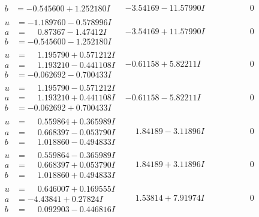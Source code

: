 \documentclass[1p]{elsarticle_modified}
\theoremstyle{definition}
\begin{document}
$$\begin{array}{c|c|c}
\begin{aligned}
b &= -0.545600 + 1.252180 I\end{aligned}
 & -3.54169 - 11.57990 I & \phantom{-0.000000 } 0 \\ \hline\begin{aligned}
u &= -1.189760 - 0.578996 I \\
a &= \phantom{-}0.87367 - 1.47412 I \\
b &= -0.545600 - 1.252180 I\end{aligned}
 & -3.54169 + 11.57990 I & \phantom{-0.000000 } 0 \\ \hline\begin{aligned}
u &= \phantom{-}1.195790 + 0.571212 I \\
a &= \phantom{-}1.193210 - 0.441108 I \\
b &= -0.062692 - 0.700433 I\end{aligned}
 & -0.61158 + 5.82211 I & \phantom{-0.000000 } 0 \\ \hline\begin{aligned}
u &= \phantom{-}1.195790 - 0.571212 I \\
a &= \phantom{-}1.193210 + 0.441108 I \\
b &= -0.062692 + 0.700433 I\end{aligned}
 & -0.61158 - 5.82211 I & \phantom{-0.000000 } 0 \\ \hline\begin{aligned}
u &= \phantom{-}0.559864 + 0.365989 I \\
a &= \phantom{-}0.668397 - 0.053790 I \\
b &= \phantom{-}1.018860 - 0.494833 I\end{aligned}
 & \phantom{-}1.84189 - 3.11896 I & \phantom{-0.000000 } 0 \\ \hline\begin{aligned}
u &= \phantom{-}0.559864 - 0.365989 I \\
a &= \phantom{-}0.668397 + 0.053790 I \\
b &= \phantom{-}1.018860 + 0.494833 I\end{aligned}
 & \phantom{-}1.84189 + 3.11896 I & \phantom{-0.000000 } 0 \\ \hline\begin{aligned}
u &= \phantom{-}0.646007 + 0.169555 I \\
a &= -4.43841 + 0.27824 I \\
b &= \phantom{-}0.092903 - 0.446816 I\end{aligned}
 & \phantom{-}1.53814 + 7.91974 I & \phantom{-0.000000 } 0 \\ \hline\begin{aligned}

\end{aligned}
\end{array}$$
\end{document}
